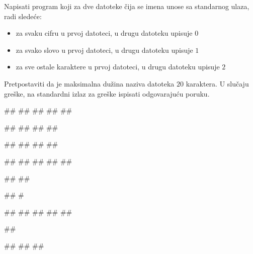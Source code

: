 \begin{Exercise}[label=p3_id16]         
Napisati program koji za dve datoteke čija se imena unose sa standarnog ulaza, radi sledeće:
\begin{itemize}
\item{za svaku cifru u prvoj datoteci, u drugu datoteku upisuje $0$}
\item{za svako slovo u prvoj datoteci, u drugu datoteku upisuje $1$}
\item{za sve ostale karaktere u prvoj datoteci, u drugu datoteku upisuje $2$}
\end{itemize}
Pretpostaviti da je maksimalna dužina naziva datoteka $20$ karaktera. 
U slučaju greške, na standardni izlaz za greške ispisati odgovarajuću poruku.

\begin{minitest}
\begin{upotreba}{1}
#\naslovInt#
##
##
##
##

##
##
##
##

##
##
##
##
\end{upotreba}
\end{minitest}
\begin{minitest}
\begin{upotreba}{2}
#\naslovInt#
##
##
##
##

##
##

##
#
\end{upotreba}
\end{minitest}
\begin{minitest}
\begin{upotreba}{3}
#\naslovInt#
##
##
##
##

##

#\naslovIzlazZaGresku#
##
##
\end{upotreba}
\end{minitest}
\end{Exercise}
\begin{Answer}[ref=p3_id16]
\end{Answer}



